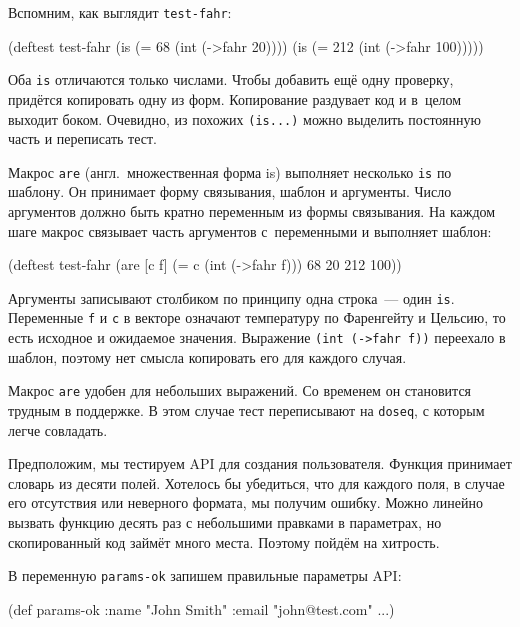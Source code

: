 Вспомним, как выглядит \verb|test-fahr|:

\begin{english}
  \begin{clojure}
(deftest test-fahr
  (is (= 68 (int (->fahr 20))))
  (is (= 212 (int (->fahr 100)))))
  \end{clojure}
\end{english}

Оба \verb|is| отличаются только числами. Чтобы добавить ещё одну проверку,
придётся копировать одну из форм. Копирование раздувает код и в~целом выходит
боком. Очевидно, из похожих \verb|(is...)| можно выделить постоянную часть и
переписать тест.


Макрос \verb|are| (англ.~множественная форма is) выполняет несколько
\verb|is| по шаблону. Он принимает форму связывания, шаблон и аргументы. Число
аргументов должно быть кратно переменным из формы связывания. На каждом шаге
макрос связывает часть аргументов с~переменными и выполняет шаблон:

\begin{english}
  \begin{clojure}
(deftest test-fahr
  (are [c f] (= c (int (->fahr f)))
    68 20
    212 100))
  \end{clojure}
\end{english}

Аргументы записывают столбиком по принципу одна строка~--- один
\verb|is|. Переменные \verb|f| и \verb|c| в векторе означают температуру по
Фаренгейту и Цельсию, то есть исходное и ожидаемое значения. Выражение
\verb|(int (->fahr f))| переехало в шаблон, поэтому нет смысла копировать его
для каждого случая.

Макрос \verb|are| удобен для небольших выражений. Со временем он становится
трудным в поддержке. В этом случае тест переписывают на \verb|doseq|, с которым
легче совладать.

Предположим, мы тестируем API для создания пользователя. Функция принимает
словарь из десяти полей. Хотелось бы убедиться, что для каждого поля, в случае
его отсутствия или неверного формата, мы получим ошибку. Можно линейно вызвать
функцию десять раз с небольшими правками в параметрах, но скопированный код
займёт много места. Поэтому пойдём на хитрость.

В переменную \verb|params-ok| запишем правильные параметры API:

\begin{english}
  \begin{clojure}
(def params-ok {:name "John Smith"
                :email "john@test.com"
                ...})
  \end{clojure}
\end{english}

